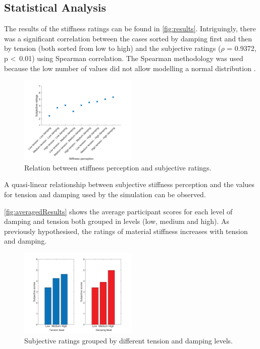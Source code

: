 \documentclass{article}
\begin{document}
\subsection{Statistical Analysis}
The results of the stiffness ratings can be found in \autoref{fig:results}. Intriguingly, there was a significant correlation between the cases sorted by damping first and then by tension (both sorted from low to high) and the subjective ratings ($\rho$ = 0.9372, p \textless \ 0.01) using Spearman correlation. The Spearman methodology was used because the low number of values did not allow modelling a normal distribution \cite{Kirk2007}.%
\begin{figure}[t]
\includegraphics[width=0.5\textwidth]{Images/corr_anal}
\caption{Relation between stiffness perception and subjective ratings.}
\centering
\label{fig:results}
\end{figure} 
A quasi-linear relationship between subjective stiffness perception and the values for tension and damping used by the simulation can be observed. %

\autoref{fig:averagedResults} shows the average participant scores for each level of damping and tension both grouped in levels (low, medium and high). As previously hypothesised, the ratings of material stiffness increases with tension and damping.
\begin{figure}[t]
\includegraphics[width=0.5\textwidth]{Images/tens_dump}
\caption{Subjective ratings grouped by different tension and damping levels.}
\centering
\label{fig:averagedResults}
\end{figure} 
\end{document}
